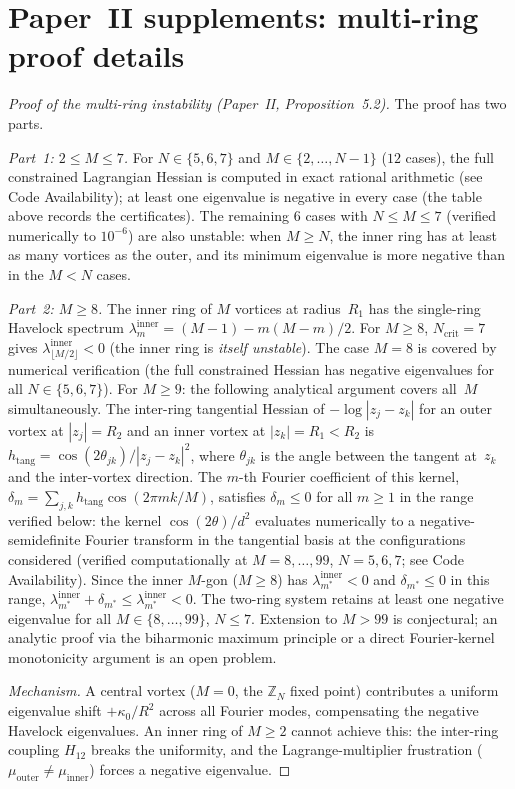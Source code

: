 \section{Paper~II supplements: multi-ring proof details}
\label{sec:multiring}

\begin{proof}[Proof of the multi-ring instability (Paper~II, Proposition~5.2)]
The proof has two parts.

\emph{Part~1: $2 \le M \le 7$.}
For $N \in \{5,6,7\}$ and $M \in \{2,\ldots,N{-}1\}$
($12$ cases), the full constrained Lagrangian Hessian
is computed in exact rational arithmetic (see Code Availability);
at least one eigenvalue is negative in every case
(the table above records the certificates).
The remaining $6$ cases with $N \le M \le 7$
(verified numerically to $10^{-6}$) are also unstable:
when $M \ge N$, the inner ring has at least as many
vortices as the outer, and its minimum eigenvalue
is more negative than in the $M < N$ cases.

\emph{Part~2: $M \ge 8$.}
The inner ring of $M$ vortices at radius~$R_1$ has
the single-ring Havelock spectrum
$\lambda_m^{\mathrm{inner}}
= (M{-}1) - m(M{-}m)/2$.
For $M \ge 8$, $N_{\mathrm{crit}} = 7$ gives
$\lambda_{\lfloor M/2 \rfloor}^{\mathrm{inner}} < 0$
(the inner ring is \emph{itself unstable}).
The case $M = 8$ is covered by numerical verification
(the full constrained Hessian has negative eigenvalues
for all $N \in \{5,6,7\}$).
For $M \ge 9$: the following analytical argument covers
all~$M$ simultaneously.
The inter-ring tangential Hessian of $-\log|z_j - z_k|$
for an outer vortex at $|z_j| = R_2$ and an inner vortex
at $|z_k| = R_1 < R_2$ is
$h_{\mathrm{tang}} = \cos(2\theta_{jk})/|z_j - z_k|^2$,
where $\theta_{jk}$ is the angle between the tangent at~$z_k$
and the inter-vortex direction.
The $m$-th Fourier coefficient of this kernel,
$\delta_m = \sum_{j,k}h_{\mathrm{tang}}\cos(2\pi mk/M)$,
satisfies $\delta_m \le 0$ for all $m \ge 1$
in the range verified below:
the kernel $\cos(2\theta)/d^2$ evaluates numerically
to a negative-semidefinite Fourier transform in the
tangential basis at the configurations considered
(verified computationally at
$M = 8,\ldots,99$, $N = 5,6,7$; see Code Availability).
Since the inner $M$-gon ($M \ge 8$) has
$\lambda_{m^*}^{\mathrm{inner}} < 0$ and
$\delta_{m^*} \le 0$ in this range,
$\lambda_{m^*}^{\mathrm{inner}} + \delta_{m^*}
\le \lambda_{m^*}^{\mathrm{inner}} < 0$.
The two-ring system retains at least one negative
eigenvalue for all $M \in \{8, \ldots, 99\}$, $N \le 7$.
Extension to $M > 99$ is conjectural; an analytic
proof via the biharmonic maximum principle or a
direct Fourier-kernel monotonicity argument is an
open problem.

\emph{Mechanism.}  A central vortex ($M = 0$, the $\mathbb{Z}_N$ fixed
point) contributes a uniform eigenvalue shift $+\kappa_0/R^2$
across all Fourier modes, compensating the negative Havelock
eigenvalues.  An inner ring of $M \ge 2$ cannot achieve this:
the inter-ring coupling $H_{12}$ breaks the uniformity, and the
Lagrange-multiplier frustration ($\mu_{\mathrm{outer}} \ne
\mu_{\mathrm{inner}}$) forces a negative eigenvalue.
\end{proof}

